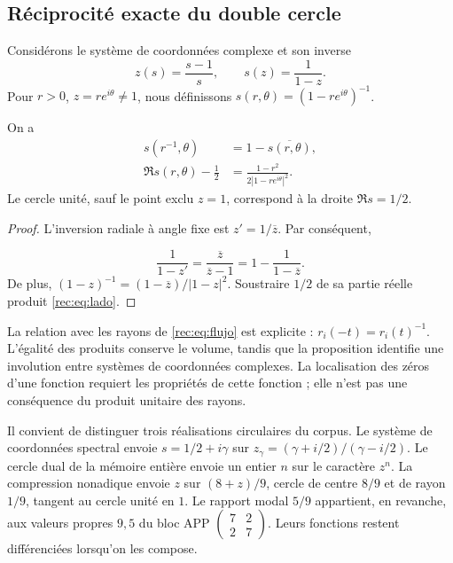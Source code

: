 \subsection{Réciprocité exacte du double cercle
}
\label{rec:doble-circulo}

Considérons le système de coordonnées complexe et son inverse
\[
 z(s)=\frac{s-1}{s},\qquad s(z)=\frac1{1-z}.
\]
Pour \(r>0\), \(z=re^{i\theta}\ne1\), nous définissons \(s(r,\theta)=(1-re^{i\theta})^{-1}\).

\begin{proposition}
\label{rec:prop:espejo}
On a
\begin{align}
 s(r^{-1},\theta)&=1-\overline{s(r,\theta)},\label{rec:eq:espejo}\\
 \Re s(r,\theta)-\frac12&=
 \frac{1-r^2}{2|1-re^{i\theta}|^2}.\label{rec:eq:lado}
\end{align}
Le cercle unité, sauf le point exclu \(z=1\), correspond à la droite \(\Re s=1/2\).
\end{proposition}
\begin{proof}
L’inversion radiale à angle fixe est \(z'=1/\overline z\). Par conséquent,

\[
 \frac1{1-z'}=\frac{\overline z}{\overline z-1}
 =1-\frac1{1-\overline z}.
\]
De plus, \((1-z)^{-1}=(1-\overline z)/|1-z|^2\). Soustraire \(1/2\) de sa partie réelle produit \eqref{rec:eq:lado}.
\end{proof}

La relation avec les rayons de \eqref{rec:eq:flujo} est explicite : \(r_i(-t)=r_i(t)^{-1}\). L’égalité des produits conserve le volume, tandis que la proposition identifie une involution entre systèmes de coordonnées complexes. La localisation des zéros d’une fonction requiert les propriétés de cette fonction ; elle n’est pas une conséquence du produit unitaire des rayons.

Il convient de distinguer trois réalisations circulaires du corpus. Le système de coordonnées spectral envoie \(s=1/2+i\gamma\) sur \(z_\gamma=(\gamma+i/2)/(\gamma-i/2)\). Le cercle dual de la mémoire entière envoie un entier \(n\) sur le caractère \(z^n\). La compression nonadique envoie \(z\) sur \((8+z)/9\), cercle de centre \(8/9\) et de rayon \(1/9\), tangent au cercle unité en \(1\). Le rapport modal \(5/9\) appartient, en revanche, aux valeurs propres \(9,5\) du bloc APP \(\left(\begin{smallmatrix}7&2\\2&7\end{smallmatrix}\right)\). Leurs fonctions restent différenciées lorsqu'on les compose.


